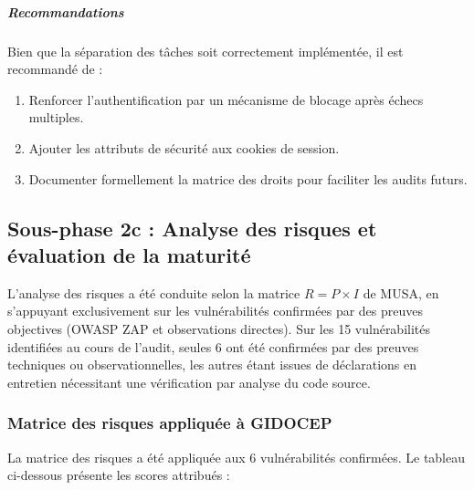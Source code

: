 \documentclass[12pt,a4paper,oneside]{report}
\begin{document}
\subparagraph{Recommandations}

Bien que la séparation des tâches soit correctement implémentée, 
il est recommandé de :

\begin{enumerate}[label={\color{gold}\ding{70}}, leftmargin=*]
	\item Renforcer l'authentification par un mécanisme de blocage 
	après échecs multiples.
	
	\item Ajouter les attributs de sécurité aux cookies de session.
	
	\item Documenter formellement la matrice des droits pour 
	faciliter les audits futurs.
\end{enumerate}
\subsection{Sous-phase 2c : Analyse des risques et \'evaluation de la maturit\'e}

L'analyse des risques a \'et\'e conduite selon la matrice $R = P \times I$ 
de MUSA, en s'appuyant exclusivement sur les vuln\'erabilit\'es 
confirm\'ees par des preuves objectives (OWASP ZAP et observations 
directes). Sur les 15 vuln\'erabilit\'es identifi\'ees au cours de 
l'audit, seules 6 ont \'et\'e confirm\'ees par des preuves techniques 
ou observationnelles, les autres étant issues de déclarations en 
entretien nécessitant une vérification par analyse du code source.

\subsubsection{Matrice des risques appliquée à GIDOCEP}

La matrice des risques a \'et\'e appliquée aux 6 vuln\'erabilit\'es 
confirmées. Le tableau ci-dessous pr\'esente les scores attribués :
\end{document}
